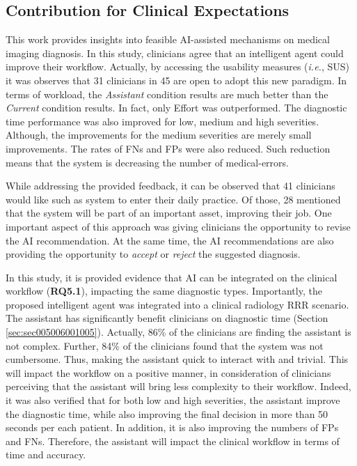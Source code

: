 \subsection{Contribution for Clinical Expectations}
\label{sec:sec005007001}

This work provides insights into feasible \ac{AI}-assisted mechanisms on medical imaging diagnosis.
In this study, clinicians agree that an intelligent agent could improve their workflow.
Actually, by accessing the usability measures ({\it i.e.}, \ac{SUS}) it was observes that 31 clinicians in 45 are open to adopt this new paradigm.
In terms of workload, the {\it Assistant} condition results are much better than the {\it Current} condition results.
In fact, only Effort was outperformed.
The diagnostic time performance was also improved for low, medium and high severities.
Although, the improvements for the medium severities are merely small improvements.
The rates of \acp{FN} and \acp{FP} were also reduced.
Such reduction means that the system is decreasing the number of medical-errors.

While addressing the provided feedback, it can be observed that 41 clinicians would like such as system to enter their daily practice.
Of those, 28 mentioned that the system will be part of an important asset, improving their job.
One important aspect of this approach was giving clinicians the opportunity to revise the \ac{AI} recommendation.
At the same time, the \ac{AI} recommendations are also providing the opportunity to {\it accept} or {\it reject} the suggested diagnosis.

In this study, it is provided evidence that \ac{AI} can be integrated on the clinical workflow ({\bf RQ5.1}), impacting the same diagnostic types.
Importantly, the proposed intelligent agent was integrated into a clinical radiology \ac{RRR} scenario.
The assistant has significantly benefit clinicians on diagnostic time (Section \ref{sec:sec005006001005}).
Actually, 86\% of the clinicians are finding the assistant is not complex.
Further, 84\% of the clinicians found that the system was not cumbersome.
Thus, making the assistant quick to interact with and trivial.
This will impact the workflow on a positive manner, in consideration of clinicians perceiving that the assistant will bring less complexity to their workflow.
Indeed, it was also verified that for both low and high severities, the assistant improve the diagnostic time, while also improving the final decision in more than 50 seconds per each patient.
In addition, it is also improving the numbers of \acp{FP} and \acp{FN}.
Therefore, the assistant will impact the clinical workflow in terms of time and accuracy.


